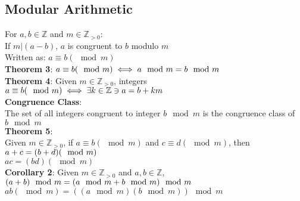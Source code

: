 \documentclass[letter]{article}
\begin{document}
\begin{multicols}{2}
  \subsection{Modular Arithmetic} 
  For $a, b \in \mathbb{Z}$ and $m \in \mathbb{Z}_{>0}$: \\
  If $m|(a-b)$, $a$ is congruent to $b$ modulo $m$ \\
  Written as: $a \equiv b(\mod m)$ \\
  \textbf{Theorem 3}:
  $\\a \equiv b(\mod m) \iff a \mod  m = b \mod m$\\
  \textbf{Theorem 4}: Given $m \in \mathbb{Z}_{>0}$, integers
  $\\a \equiv b(\mod m) \iff \exists k \in \mathbb{Z} \ni a = b + km$\\
  \textbf{Congruence Class}:\\ The set of all integers congruent to integer
  $b \mod m$ is the congruence class of $b \mod m$ \\
  \textbf{Theorem 5}:\\ Given $m \in \mathbb{Z}_{>0}$, if $a \equiv b(\mod m)$
  and $c \equiv d(\mod m)$, then
  $\\a + c = (b + d)(\mod m)$\\
  $ac = (bd)(\mod m)$\\
  \textbf{Corollary 2}: Given $m \in \mathbb{Z}_{>0}$ and $a, b \in \mathbb{Z}$,
  $\\(a+b)\mod m = (a\mod m + b\mod m)\mod m$\\
  $ab(\mod m) = ((a\mod m)(b\mod m))\mod m$


\end{multicols}
\end{document}
